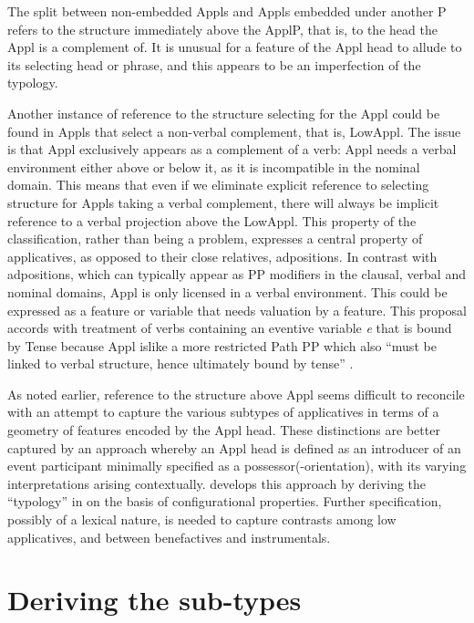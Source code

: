 \documentclass[output=paper,colorlinks,citecolor=brown,nonflat]{./langscibook}
\begin{document}
The split between non-embedded Appls and Appls embedded under another \liv P refers to the structure immediately above the ApplP, that is, to the head the Appl is a complement of. It is unusual for a feature of the Appl head to allude to its selecting head or phrase, and this appears to be an imperfection of the typology.  

Another instance of reference to the structure selecting for the Appl could be found in Appls that select a non-verbal complement, that is, LowAppl. The issue is that Appl exclusively appears as a complement of a verb: Appl needs a verbal environment either above or below it, as it is incompatible in the nominal domain.  This means that even if we eliminate explicit reference to selecting structure for Appls taking a verbal complement, there will always be implicit reference to a verbal projection above the LowAppl. This property of the classification, rather than being a problem, expresses a central property of applicatives, as opposed to their close relatives, adpositions. In contrast with adpositions, which can typically appear as PP modifiers in the clausal, verbal and nominal domains, Appl is only licensed in a verbal environment. This could be expressed as a feature or variable that needs valuation by a \liv feature. This proposal accords with  treatment of verbs containing an eventive variable \textit{e} that is bound by Tense because Appl islike a more restricted Path PP which also “must be linked to verbal structure, hence ultimately bound by tense” \citep[35]{Svenonius2007}. 

As noted earlier, reference to the structure above Appl seems difficult to reconcile with an attempt to capture the various subtypes of applicatives in terms of a geometry of features encoded by the Appl head. These distinctions are better captured by an approach whereby an Appl head is defined as an introducer of an event participant minimally specified as a possessor(-orientation), with its varying interpretations arising contextually.  develops this approach by deriving the “typology” in  on the basis of configurational properties. Further specification, possibly of a lexical nature, is needed to capture contrasts among low applicatives, and between benefactives and instrumentals.  

\section{Deriving the sub-types}\label{sec:cuervo:4}
\end{document}
